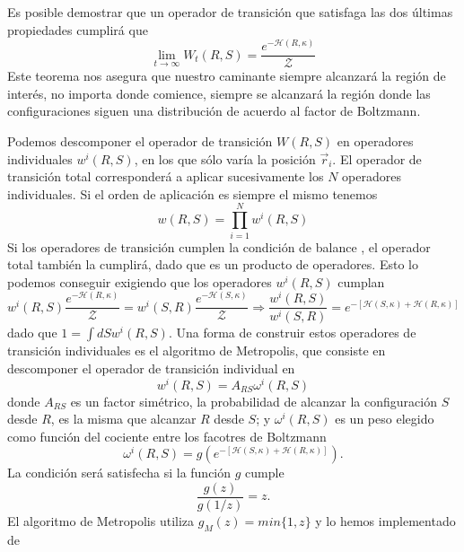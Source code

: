 Es posible demostrar que un operador de transición que satisfaga las dos
últimas propiedades cumplirá que
\begin{equation*}
\lim_{t\rightarrow \infty}W_t(R,S)=\frac{e^{-\mathcal{H}(R,\kappa)}}{\mathcal{Z}}
\end{equation*}
Este teorema nos asegura que nuestro caminante siempre alcanzará la región de
interés, no importa donde comience, siempre se alcanzará la región donde las
configuraciones siguen una distribución de acuerdo al factor de Boltzmann. 

Podemos descomponer el operador de transición $W(R,S)$ en operadores
individuales $w^i(R,S)$, en los que sólo varía la posición $\vec{r}_i$. El
operador de transición total corresponderá a aplicar sucesivamente los $N$
operadores individuales. Si el orden de aplicación es siempre el mismo tenemos
\begin{equation*}
w(R,S)=\prod^{N}_{i=1}w^i(R,S)
\end{equation*}
Si los operadores de transición cumplen la condición de
balance \label{ecuacion_balance}, el operador total también la cumplirá, dado
que es un producto de operadores. Esto lo podemos conseguir exigiendo que los operadores
$w^i(R,S)$ cumplan
\begin{equation}\label{balance_detallado}
w^i(R,S)\frac{e^{-\mathcal{H}(R,\kappa)}}{\mathcal{Z}}=w^i(S,R)\frac{e^{-\mathcal{H}(S,\kappa)}}{\mathcal{Z}}\Rightarrow \frac{w^i(R,S)}{w^i(S,R)}=e^{-[\mathcal{H}(S,\kappa)+\mathcal{H}(R,\kappa)]}
\end{equation}
dado que $1=\int dS w^i(R,S)$. Una forma de construir estos operadores de
transición individuales es el algoritmo de Metropolis, que consiste en
descomponer el operador de transición individual en 
 \begin{equation*}
 w^i(R,S)=A_{RS}\omega^i(R,S)
\end{equation*}
donde $A_{RS}$ es un factor simétrico, la probabilidad de alcanzar la
configuración $S$ desde $R$, es la misma que alcanzar $R$ desde $S$; y
$\omega^i(R,S)$ es un peso elegido como función del cociente entre los
facotres de Boltzmann
\begin{equation*}
\omega^i(R,S)=g(e^{-[\mathcal{H}(S,\kappa)+\mathcal{H}(R,\kappa)]}).
\end{equation*}
La condición \label{balance_detallado} será satisfecha si la función $g$
cumple
\begin{equation*}
\frac{g(z)}{g(1/z)}=z.
\end{equation*}
El algoritmo de Metropolis utiliza $g_M(z)=min\{1,z\}$ y lo hemos implementado de
